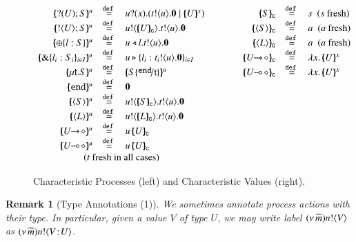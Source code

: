 \documentclass[preprint,11pt]{elsarticle}
\newtheorem{remark}{Remark}[section]
\begin{document}
{{%
\begin{figure}[t!]
\[
	\begin{array}{rclcrcl}
		\mapchar{\btinp{U} S}{u}
		&\defeq&
		\binp{u}{x} (\bout{t}{u} \inact \Par \mapchar{U}{x})
		&\qquad &
		\omapchar{S}  & \defeq &  s ~~ (s \textrm{ fresh})
		\\
		\mapchar{\btout{U} S}{u}
		&\defeq&
		\bout{u}{\omapchar{U}} \bout{t}{u} \inact
		&&
		\omapchar{\chtype{S}} &\defeq& a ~~ (a \textrm{ fresh})
		\\
		\mapchar{\btsel{l : S}}{u}
		& \defeq &
		\bsel{u}{l} \bout{t}{u} \inact
		&&
		\omapchar{\chtype{L}} &\defeq&a ~~ (a \textrm{ fresh})
		\\
		\mapchar{\btbra{l_i: S_i}_{i \in I}}{u}
		& \defeq &
		\bbra{u}{l_i: \bout{t_i}{u} \inact}_{i \in I}		 
		&&
		\omapchar{\shot{U}} &\defeq& \abs{x}{\mapchar{U}{x}}
		\\
		 
%
		\mapchar{ \trec{t}{S} }{u} &\defeq& \mapchar{S \subst{\tinact}{\vart{t}} }{u}

		&&
		\omapchar{\lhot{U}} & \defeq &  \abs{x}{\mapchar{U}{x}}
		\\
		\mapchar{\tinact}{u}
		& \defeq &
		\inact
		\\
		\mapchar{\chtype{S}}{u} 
		&\defeq&
		\bout{u}{\omapchar{S}} \bout{t}{u} \inact		 
		\\
		\mapchar{\chtype{L}}{u}
		&\defeq&
		 \bout{u}{\omapchar{L}} \bout{t}{u} \inact 
		\\
		\mapchar{\shot{U}}{u}
		&\defeq& 
		\appl{u}{\omapchar{U}}
		\\
		\mapchar{\lhot{U}}{u}
		&\defeq &
		\appl{u}{\omapchar{U}}
		\\
		\multicolumn{3}{c}{\text{($t$ fresh in all cases)}} & & & 
	\end{array}
	\]
\caption{Characteristic Processes (left) and Characteristic Values (right).  \label{fig:char}}
%
\end{figure}


\begin{remark}[Type Annotations (1)]\label{r:anntypes}
We sometimes annotate process actions with their type. In particular, 
given a value $V$ of type $U$, we may write label
$(\nu\, \widetilde{m}) n ! \langle V \rangle$
as $(\nu\, \widetilde{m}) n ! \langle V \! : \! U \rangle$.
\end{remark}

}}
\end{document}
